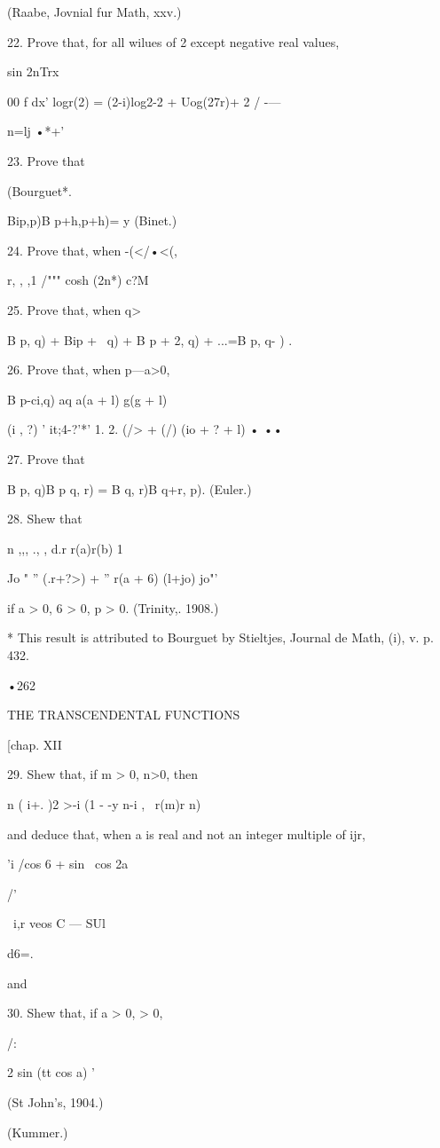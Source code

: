 (Raabe, Jovnial fur Math, xxv.)

22. Prove that, for all wilues of 2 except negative real values,

sin 2nTrx

00 f dx' logr(2) = (2-i)log2-2 + Uog(27r)+ 2 / -—

n=lj •*+'

23. Prove that

(Bourguet*.

Bip,p)B p+h,p+h)= y (Binet.)

24. Prove that, when -(</•<(,

r, , ,1 /""" cosh (2n*) c?M

25. Prove that, when q>\,

B p, q) + Bip + \, q) + B p + 2, q) + ...=B p, q- ) .

26. Prove that, when p—a>0,

B p-ci,q) aq a(a + l) g(g + l)

 (i , ?) ' it;4-?'*' 1. 2. (/> + (/) (io + ? + l) • ••

27. Prove that

B p, q)B p q, r) = B q, r)B q+r, p). (Euler.)

28. Shew that

n ,,, ., , d.r r(a)r(b) 1

Jo " '' (.r+?>) + '' r(a + 6) (l+jo) jo"'

if a > 0, 6 > 0, p > 0. (Trinity,. 1908.)

* This result is attributed to Bourguet by Stieltjes, Journal de Math,
(i), v. p. 432.

•262

THE TRANSCENDENTAL FUNCTIONS

[chap. XII

29. Shew that, if m > 0, n>0, then

n ( i+. )2 >-i (1 - -y n-i , \ r(m)r n)

and deduce that, when a is real and not an integer multiple of ijr,

'i /cos 6 + sin \ cos 2a

/'

\ i,r veos C — SUl

d6=.

and

30. Shew that, if a > 0, > 0,

/:

2 sin (tt cos a) '

(St John's, 1904.)

(Kummer.)

